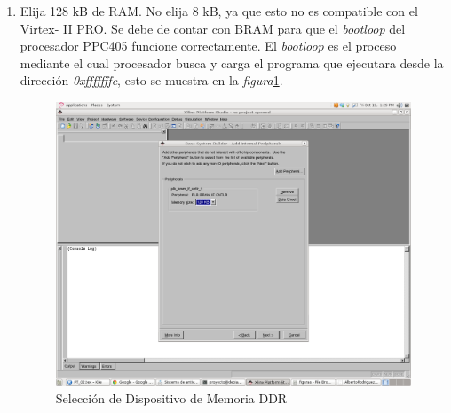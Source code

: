 \begin{enumerate}
  
\item Elija 128 kB de RAM. No elija 8 kB, ya que esto no es compatible con el
Virtex- II PRO. Se debe de contar  con BRAM para que el \emph{bootloop} del
procesador PPC405 funcione correctamente. El \emph{bootloop} es el proceso
mediante el cual procesador busca y carga el programa que ejecutara desde la
dirección \emph{0xfffffffc}, esto se muestra en la
\emph{figura}\ref{Configuracón de BRAM}.
  \begin{figure}[h!] 
  \centering
  \includegraphics[scale=.25]{./figuras/EDK9.png}
  \caption{Selección de Dispositivo de Memoria DDR}
  \label{Configuracón de BRAM}
  \end{figure}


\end{enumerate}
